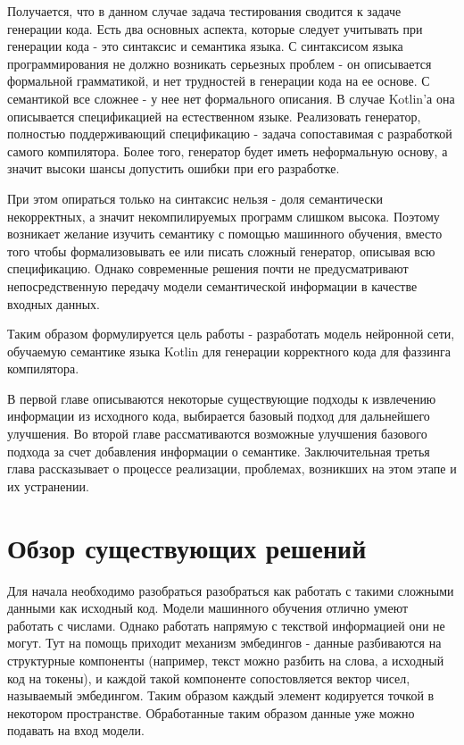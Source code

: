 \documentclass[times,specification,annotation]{itmo-student-thesis}
\begin{document}
Получается, что в данном случае задача тестирования сводится к задаче генерации кода. Есть два основных аспекта, которые следует учитывать при генерации кода - это синтаксис и семантика языка. С синтаксисом языка программирования не должно возникать серьезных проблем - он описывается формальной грамматикой, и нет трудностей в генерации кода на ее основе. С семантикой все сложнее - у нее нет формального описания. В случае Kotlin'а она описывается спецификацией на естественном языке. Реализовать генератор, полностью поддерживающий спецификацию - задача сопоставимая с разработкой самого компилятора. Более того, генератор будет иметь неформальную основу, а значит высоки шансы допустить ошибки при его разработке.

При этом опираться только на синтаксис нельзя - доля семантически некорректных, а значит некомпилируемых программ слишком высока. Поэтому возникает желание изучить семантику с помощью машинного обучения, вместо того чтобы формализовывать ее или писать сложный генератор, описывая всю спецификацию. Однако современные решения почти не предусматривают непосредственную передачу модели семантической информации в качестве входных данных.

Таким образом формулируется цель работы - разработать модель нейронной сети, обучаемую семантике языка Kotlin для генерации корректного кода для фаззинга компилятора.

В первой главе описываются некоторые существующие подходы к извлечению информации из исходного кода, выбирается базовый подход для дальнейшего улучшения. Во второй главе рассмативаются возможные улучшения базового подхода за счет добавления информации о семантике. Заключительная третья глава рассказывает о процессе реализации, проблемах, возникших на этом этапе и их устранении.


\chapter{Обзор существующих решений}

Для начала необходимо разобраться разобраться как работать с такими сложными данными как исходный код. 
Модели машинного обучения отлично умеют работать с числами. Однако работать напрямую с текствой информацией они не могут. Тут на помощь приходит механизм эмбедингов - данные разбиваются на структурные компоненты (например, текст можно разбить на слова, а исходный код на токены), и каждой такой компоненте сопостовляется вектор чисел, называемый эмбедингом. Таким образом каждый элемент кодируется точкой в некотором пространстве. Обработанные таким образом данные уже можно подавать на вход модели.
\end{document}
